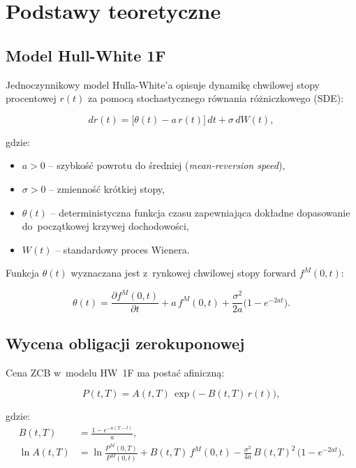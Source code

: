 \documentclass[12pt,a4paper]{article}
\begin{document}
\section{Podstawy teoretyczne}
\label{sec:theory}

\subsection{Model Hull-White 1F}

Jednoczynnikowy model Hulla-White'a opisuje dynamikę chwilowej stopy
procentowej $r(t)$ za pomocą stochastycznego równania różniczkowego (SDE):

\begin{equation}
  \label{eq:hw-sde}
  dr(t) = \bigl[\theta(t) - a\,r(t)\bigr]\,dt + \sigma\,dW(t),
\end{equation}

gdzie:
\begin{itemize}
  \item $a > 0$ -- szybkość powrotu do średniej (\emph{mean-reversion speed}),
  \item $\sigma > 0$ -- zmienność krótkiej stopy,
  \item $\theta(t)$ -- deterministyczna funkcja czasu zapewniająca
        dokładne dopasowanie do~początkowej krzywej dochodowości,
  \item $W(t)$ -- standardowy proces Wienera.
\end{itemize}

Funkcja $\theta(t)$ wyznaczana jest z~rynkowej chwilowej stopy forward
$f^M(0,t)$:

\begin{equation}
  \label{eq:theta}
  \theta(t) = \frac{\partial f^M(0,t)}{\partial t}
              + a\,f^M(0,t)
              + \frac{\sigma^2}{2a}\bigl(1 - e^{-2at}\bigr).
\end{equation}

\subsection{Wycena obligacji zerokuponowej}

Cena ZCB w~modelu HW~1F ma postać afiniczną:

\begin{equation}
  \label{eq:zcb}
  P(t,T) = A(t,T)\,\exp\bigl(-B(t,T)\,r(t)\bigr),
\end{equation}

gdzie:
\begin{align}
  B(t,T) &= \frac{1 - e^{-a(T-t)}}{a}, \label{eq:B}\\[6pt]
  \ln A(t,T) &= \ln\frac{P^M(0,T)}{P^M(0,t)}
               + B(t,T)\,f^M(0,t)
               - \frac{\sigma^2}{4a}\,B(t,T)^2\,
                 \bigl(1 - e^{-2at}\bigr). \label{eq:lnA}
\end{align}
\end{document}
